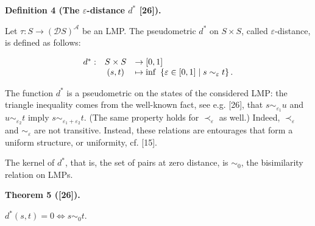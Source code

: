 \documentclass[10pt,a4paper]{article}
\begin{document}
 
 
\par\medskip\noindent\textbf{Definition 4 (The $\varepsilon$-distance $d^{*}$ [26]).}\par
 
 
Let $\tau:S\to(\mathcal{D}S)^{\mathcal{A}}$ be an LMP. The pseudometric $d^{*}$ on $S\times S$, called $\varepsilon$-distance, is defined as follows:\par
  
\par  \quad  \[\begin{array}[]{lcl}d^{*}:&S\times S&\rightarrow[0,1]\\
&(s,t)&\mapsto\inf\ \left\{\varepsilon\in[0,1]\mid s\sim_{\varepsilon}t\right\}.\end{array}\]\quad  \quad  
  
 
 
 
The function $d^{*}$ is a pseudometric on the states of the considered LMP: the triangle inequality comes from the well-known fact, see e.g. [26], that $s\sim_{\varepsilon_{1}}u$ and $u\sim_{\varepsilon_{2}}t$ imply $s\sim_{\varepsilon_{1}+\varepsilon_{2}}t$. (The same property holds for $\prec_{\varepsilon}$ as well.) Indeed, $\prec_{\varepsilon}$ and $\sim_{\varepsilon}$ are not transitive. Instead, these relations are entourages that form a uniform structure, or uniformity, cf. [15].\par
 
 
 
The kernel of $d^{*}$, that is, the set of pairs at zero distance, is $\sim_{0}$, the bisimilarity relation on LMPs.\par
 
 
 
\par\medskip\noindent\textbf{Theorem 5 ([26]).}\par
 
 
$d^{*}(s,t)=0\Leftrightarrow s\sim_{0}t$.\par
 
 
\end{document}
